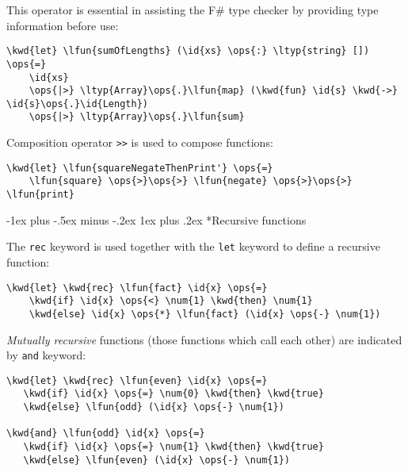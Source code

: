 \documentclass[10pt,landscape]{article}
\makeatletter
\renewcommand{\subsubsection}{\@startsection{subsubsection}{3}{0mm}%
                                {-1ex plus -.5ex minus -.2ex}%
                                {1ex plus .2ex}%
                                {\normalfont\small\bfseries}}
\newcommand{\id}[1]{\textcolor[HTML]{000000}{#1}}
\newcommand{\kwd}[1]{\textcolor[HTML]{0000FF}{#1}}
\newcommand{\ops}[1]{\textcolor[HTML]{000000}{#1}}
\newcommand{\num}[1]{\textcolor[HTML]{000000}{#1}}
\newcommand{\ltyp}[1]{\textcolor[HTML]{2B91AF}{#1}}
\newcommand{\lfun}[1]{\textcolor[HTML]{0000A0}{#1}}
\makeatother
\begin{document}
\begin{multicols}{3}
\begin{Verbatim}[commandchars=\\\{\}]
\end{Verbatim}



This operator is essential in assisting the F\# type checker by providing type information before use:
\begin{Verbatim}[commandchars=\\\{\}]
\kwd{let} \lfun{sumOfLengths} (\id{xs} \ops{:} \ltyp{string} []) \ops{=} 
    \id{xs} 
    \ops{|>} \ltyp{Array}\ops{.}\lfun{map} (\kwd{fun} \id{s} \kwd{->} \id{s}\ops{.}\id{Length})
    \ops{|>} \ltyp{Array}\ops{.}\lfun{sum}

\end{Verbatim}



Composition operator \texttt{>>} is used to compose functions:
\begin{Verbatim}[commandchars=\\\{\}]
\kwd{let} \lfun{squareNegateThenPrint'} \ops{=} 
    \lfun{square} \ops{>}\ops{>} \lfun{negate} \ops{>}\ops{>} \lfun{print}

\end{Verbatim}

\subsubsection*{Recursive functions}



The \texttt{rec} keyword is used together with the \texttt{let} keyword to define a recursive function:
\begin{Verbatim}[commandchars=\\\{\}]
\kwd{let} \kwd{rec} \lfun{fact} \id{x} \ops{=}
    \kwd{if} \id{x} \ops{<} \num{1} \kwd{then} \num{1}
    \kwd{else} \id{x} \ops{*} \lfun{fact} (\id{x} \ops{-} \num{1})

\end{Verbatim}



\emph{Mutually recursive} functions (those functions which call each other) are indicated by \texttt{and} keyword:
\begin{Verbatim}[commandchars=\\\{\}]
\kwd{let} \kwd{rec} \lfun{even} \id{x} \ops{=}
   \kwd{if} \id{x} \ops{=} \num{0} \kwd{then} \kwd{true} 
   \kwd{else} \lfun{odd} (\id{x} \ops{-} \num{1})

\kwd{and} \lfun{odd} \id{x} \ops{=}
   \kwd{if} \id{x} \ops{=} \num{1} \kwd{then} \kwd{true} 
   \kwd{else} \lfun{even} (\id{x} \ops{-} \num{1})


\end{Verbatim}
\end{multicols}
\end{document}
